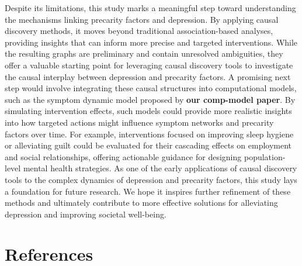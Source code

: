 \documentclass[
]{article}
\begin{document}
Despite its limitations, this study marks a meaningful step toward
understanding the mechanisms linking precarity factors and depression.
By applying causal discovery methods, it moves beyond traditional
association-based analyses, providing insights that can inform more
precise and targeted interventions. While the resulting graphs are
preliminary and contain unresolved ambiguities, they offer a valuable
starting point for leveraging causal discovery tools to investigate the
causal interplay between depression and precarity factors. A promising
next step would involve integrating these causal structures into
computational models, such as the symptom dynamic model proposed by
\textbf{our comp-model paper}. By simulating intervention effects, such
models could provide more realistic insights into how targeted actions
might influence symptom networks and precarity factors over time. For
example, interventions focused on improving sleep hygiene or alleviating
guilt could be evaluated for their cascading effects on employment and
social relationships, offering actionable guidance for designing
population-level mental health strategies. As one of the early
applications of causal discovery tools to the complex dynamics of
depression and precarity factors, this study lays a foundation for
future research. We hope it inspires further refinement of these methods
and ultimately contribute to more effective solutions for alleviating
depression and improving societal well-being.

\section{References}\label{references}
\end{document}
